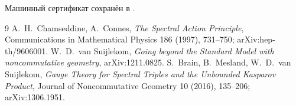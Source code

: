 Машинный сертификат сохранён в
.

\begin{thebibliography}{9}
A.~H.~Chamseddine, A.~Connes,
\emph{The Spectral Action Principle},
Communications in Mathematical Physics 186 (1997), 731--750;
arXiv:hep-th/9606001.
W.~D.~van Suijlekom,
\emph{Going beyond the Standard Model with noncommutative geometry},
arXiv:1211.0825.
S.~Brain, B.~Mesland, W.~D.~van Suijlekom,
\emph{Gauge Theory for Spectral Triples and the Unbounded Kasparov Product},
Journal of Noncommutative Geometry 10 (2016), 135--206;
arXiv:1306.1951.
\end{thebibliography}
